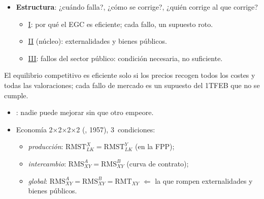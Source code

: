 \documentclass{article}
\begin{document}
\begin{columnas}
\begin{itemize}
\begin{itemize}
  \item ¿Falla también el Estado? ¿Cuándo intervenir?
  \end{itemize}
\item \textbf{Estructura}: ¿cuándo falla?, ¿cómo se corrige?, ¿quién corrige al que corrige?
  \begin{itemize}
  \item \hyperref[rep:I]{I}: por qué el EGC es eficiente; cada fallo, un supuesto roto.
  \item \hyperref[rep:II]{II} (núcleo): externalidades y bienes públicos.
  \item \hyperref[rep:III]{III}: fallos del sector público: condición necesaria, no suficiente.
  \end{itemize}
\end{itemize}

\begin{ideaclave}
El equilibrio competitivo es eficiente solo si los precios recogen todos los costes y todas las valoraciones; cada fallo de mercado es un supuesto del 1TFEB que no se cumple.
\end{ideaclave}

\begin{itemize}
\item {}: nadie puede mejorar sin que otro empeore.
\item Economía 2×2×2×2 (, 1957), 3~condiciones:
  \begin{itemize}
  \item \emph{producción}: $\mathrm{RMST}^X_{LK}=\mathrm{RMST}^Y_{LK}$ (en la FPP);
  \item \emph{intercambio}: $\mathrm{RMS}^A_{XY}=\mathrm{RMS}^B_{XY}$ (curva de contrato);
  \item \emph{global}: $\mathrm{RMS}^A_{XY}=\mathrm{RMS}^B_{XY}=\mathrm{RMT}_{XY}$ $\Leftarrow$ la que rompen externalidades y bienes públicos.
  \end{itemize}
\end{itemize}


\end{columnas}
\end{document}
